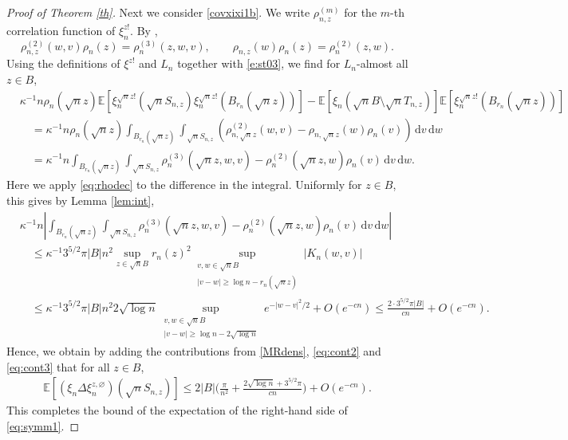 \documentclass{amsart}
\theoremstyle{plain}
\theoremstyle{definition}
\theoremstyle{remark}
\def\E{\mathbb E}
\def\d{\mathrm d}
\begin{document}
\begin{proof}[Proof of Theorem \ref{th}]
	Next we consider \eqref{covxixi1b}. We write $\rho_{n,z}^{(m)}$ for the $m$-th correlation function of $\xi_n^{z!}$. 
	By \cite[Lemma 6.4]{ST03},
	\begin{equation}\label{e:st03}
	\rho_{n,z}^{(2)}(w,v)\rho_n(z)  = \rho_n^{(3)}(z,w,v) , \qquad \rho_{n,z}(w)\rho_n(z) = \rho_n^{(2)}(z,w).
	\end{equation}
	 Using the definitions of $\xi^{z!}$ and $L_n$ together with \eqref{e:st03}, we find for $L_n$-almost all $z \in B$, 
	 	\begin{align*}
	 	& \kappa^{-1}n \rho_n(\sqrt n z)\E[\xi_n^{\sqrt nz!}(\sqrt nS_{n,z})\xi_n^{\sqrt nz!}(B_{r_n}(\sqrt n z))] - \E[\xi_n(\sqrt nB\setminus \sqrt nT_{n,z})]\E[\xi_n^{\sqrt nz!}(B_{r_n}(\sqrt nz))]\\
	 	&\quad = \kappa^{-1}n \rho_n(\sqrt n z) \int_{B_{r_n}(\sqrt n z)}\int_{\sqrt n S_{n,z}}  (\rho_{n,\sqrt n z}^{(2)}(w,v) -  \rho_{n,\sqrt n z}(w) \rho_n(v)) \,\d v\,  \d w \\ 
	 	&\quad=\kappa^{-1}n\int_{B_{r_n}(\sqrt n z)}\int_{\sqrt n S_{n,z}} \rho_n^{(3)}(\sqrt n z,w,v) -  \rho_n^{(2)}(\sqrt n z,w) \rho_n(v) \,\d v\,  \d w .
	 \end{align*}
	 	Here we apply \eqref{eq:rhodec} to the difference in the integral. Uniformly for $z\in B$, this gives by Lemma \ref{lem:int},
	 \begin{align}
	 	&\kappa^{-1}n \left| \int_{B_{r_n}(\sqrt n z)}\int_{\sqrt n S_{n,z}} \rho_n^{(3)}(\sqrt n z,w,v) -  \rho_n^{(2)}(\sqrt n z,w) \rho_n(v) \,\d v\,  \d w \right| \nonumber\\ 
	    &\quad \le \kappa^{-1} 3^{5/2}\pi |B| n^2 \sup_{z \in \sqrt n B} r_n(z)^2 \sup_{\substack{v,w \in \sqrt nB\\ |v-w| \ge \log n-r_n(\sqrt n z)}} |K_n(w,v)|\nonumber\\
	 	&\quad  \le  \kappa^{-1} 3^{5/2} \pi |B| n^2 2 \sqrt{\log n} \sup_{\substack{v,w \in \sqrt nB\\ |v-w| \ge \log n-2 \sqrt {\log n}}} e^{-|w-v|^2/2}+ O(e^{-cn})\le \frac{2 \cdot 3^{5/2} \pi |B|}{cn}+O(e^{-cn}).\label{eq:cont3}
	 \end{align}
Hence, we obtain by adding the contributions from \eqref{MRdens}, \eqref{eq:cont2} and \eqref{eq:cont3} that for all $z \in B$, 
\begin{align}
	\E [(\xi_n \Delta \xi_n^{z,\varnothing}) (\sqrt nS_{n,z})] \le 2|B|\Big( \frac{ \pi}{n^2} +  \frac{2 \sqrt{\log n} + 3^{5/2} \pi }{cn} \Big) +O(e^{-cn}). \label{eq:xisymmbou}
\end{align}
This completes the bound of the expectation of the right-hand side of \eqref{eq:symm1}.


\end{proof}
\end{document}
